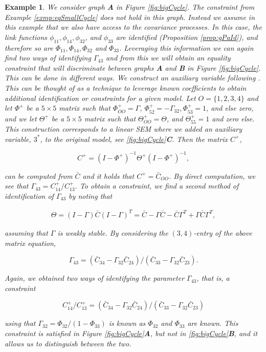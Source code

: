 \documentclass[accepted]{uai2021} %
\newtheorem{exmp}[thm]{Example}
\begin{document}
\begin{exmp}
	
	
	We consider graph \textbf{A} in Figure \ref{fig:bigCycle}. The constraint 
	from Example \ref{exmp:eqSmallCycle} does not hold in this graph. Instead 
	we assume in 
	this example that we also have access to the 
	covariance processes. In this case, the link functions 
	$\phi_{11},\phi_{14},\phi_{32}$, and $\phi_{33}$ are identified 
	(Proposition 
	\ref{prop:gPaId}), and therefore so are $\Phi_{11}, \Phi_{14} , \Phi_{32}$ 
	and 
	$\Phi_{33}$.  Leveraging this information we can again find two ways of 
	identifying 
	$\Gamma_{43}$ and from this we will obtain an equality constraint 
	that 
	will 
	discriminate between graphs \textbf{A} and \textbf{B} in 
	Figure \ref{fig:bigCycle}. This can be done in different ways. We 
	construct an {\it auxiliary 
	variable} following \cite{chenIJCAI2016, chenICML2017}. This can be thought 
	of as a technique to leverage known coefficients to obtain additional 
	identification or constraints for a given model. Let $O=\{1,2,3,4\}$ and 
	let $\Phi^+$ be a 
	$5\times 5$ 
	matrix such that $\Phi_{OO}^+ = \Gamma$, $\Phi_{52}^+ = 
	-\Gamma_{32}, \Phi_{53}^+ 
	= 1$, and else zero, and we let $\Theta^+$ be a $5\times 5$ matrix such 
	that $\Theta_{OO}^+ = \Theta$, and $\Theta_{55}^+ = 1$ and zero else. This 
	construction corresponds to a linear SEM where we added an \emph{auxiliary 
	variable}, $3^*$, to the original model, see \ref{fig:bigCycle}\textbf{C}. 
	Then 
	the matrix $C^+$,
	
	$$
	C^+ = (I - \Phi^+)^{-1}\Theta^+(I-\Phi^+)^{-1},
	$$
	
	can be computed from $\bar{C}$ and it holds that 
	$C^+=\bar{C}_{OO}$. By direct computation, we see that $\Gamma_{43} = 
	C_{14}^+/C_{13}^+$. To obtain a constraint, we find a second method of 
	identification of $\Gamma_{43}$ by noting that
	
	\begin{align}
		\Theta = (I - \Gamma)\bar{C}(I-\Gamma)^T = \bar{C} - 
		\Gamma\bar{C} - \bar{C}\Gamma^T + 
		\Gamma\bar{C}\Gamma^T,
		\label{eq:expandTheta}
	\end{align}

	
	assuming that $\Gamma$ is weakly stable. By considering the 
	$(3,4)$-entry of the above matrix equation,
	
	$$
	\Gamma_{43} = (\bar{C}_{34} - 
	\Gamma_{32}\bar{C}_{24})/(\bar{C}_{33} - 
	\Gamma_{32}\bar{C}_{23}).
	$$
	
 Again, we obtained two ways of identifying 
 the parameter $\Gamma_{43}$, that is, a constraint
 
 $$
 C_{14}^+/C_{13}^+ = (\bar{C}_{34} - 
 \Gamma_{32}\bar{C}_{24})/(\bar{C}_{33} - 
 \Gamma_{32}\bar{C}_{23})
 $$
 
 using that $\Gamma_{32} = {\Phi}_{32}/(1-\Phi_{33})$ is known as 
 ${\Phi}_{32}$ and 
 ${\Phi}_{33}$ are known. This constraint is satisfied in 
 Figure
 \ref{fig:bigCycle}\textbf{A}, 
 but not in \ref{fig:bigCycle}\textbf{B}, and it allows us to 
 distinguish between 
 the two.
 
 \label{exmp:eqBigCycle}
\end{exmp}
\end{document}
